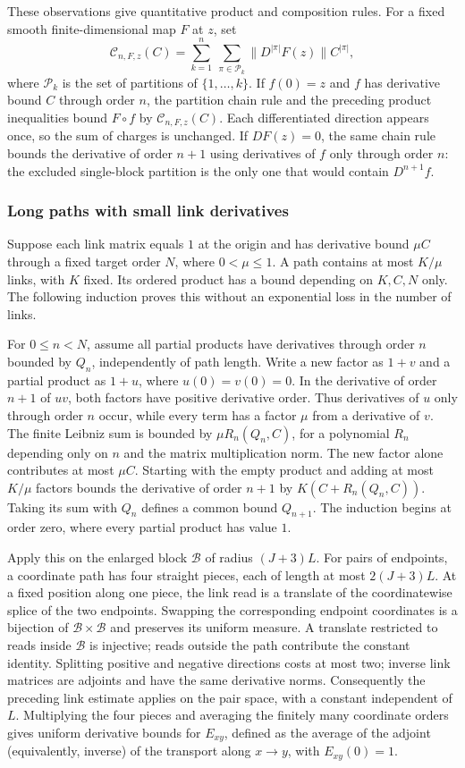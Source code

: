 These observations give quantitative product and composition rules.
For a fixed smooth finite-dimensional map $F$ at $z$, set
\[
 \mathcal C_{n,F,z}(C)
   =\sum_{k=1}^n\ \sum_{\pi\in\mathcal P_k}
                   \|D^{|\pi|}F(z)\|C^{|\pi|},
\]
where $\mathcal P_k$ is the set of partitions of $\{1,\ldots,k\}$.
If $f(0)=z$ and $f$ has derivative bound $C$ through order $n$, the
partition chain rule and the preceding product inequalities bound
$F\circ f$ by $\mathcal C_{n,F,z}(C)$. Each differentiated direction
appears once, so the sum of charges is unchanged. If $DF(z)=0$, the
same chain rule bounds the derivative of order $n+1$ using derivatives
of $f$ only through order $n$: the excluded single-block partition is
the only one that would contain $D^{n+1}f$.

\subsubsection{Long paths with small link derivatives}
Suppose each link matrix equals $1$ at the origin and has derivative
bound $\mu C$ through a fixed target order $N$, where $0<\mu\leq1$. A path contains
at most $K/\mu$ links, with $K$ fixed. Its ordered product has a bound
depending on $K,C,N$ only. The following induction proves this without
an exponential loss in the number of links.

For $0\leq n<N$, assume all partial products have derivatives through order $n$ bounded
by $Q_n$, independently of path length. Write a new factor as $1+v$
and a partial product as $1+u$, where $u(0)=v(0)=0$. In the derivative
of order $n+1$ of $uv$, both factors have positive derivative order.
Thus derivatives of $u$ only through order $n$ occur, while every term
has a factor $\mu$ from a derivative of $v$. The finite Leibniz sum is
bounded by $\mu R_n(Q_n,C)$, for a polynomial $R_n$ depending only on
$n$ and the matrix multiplication norm. The new factor alone contributes
at most $\mu C$. Starting with the empty product and adding at most
$K/\mu$ factors bounds the derivative of order $n+1$ by
$K(C+R_n(Q_n,C))$. Taking its sum with $Q_n$ defines a common bound
$Q_{n+1}$. The induction begins at order zero, where every partial
product has value $1$.

Apply this on the enlarged block $\mathcal B$ of radius $(J+3)L$.
For pairs of endpoints, a coordinate path has four straight pieces,
each of length at most $2(J+3)L$. At a fixed position along one piece,
the link read is a translate of the coordinatewise splice of the two
endpoints. Swapping the corresponding endpoint coordinates is a
bijection of $\mathcal B\times\mathcal B$ and preserves its uniform
measure. A translate restricted to reads inside $\mathcal B$ is
injective; reads outside the path contribute the constant identity.
Splitting positive and negative directions costs at most two; inverse
link matrices are adjoints and have the same derivative norms.
Consequently the preceding link estimate applies on the pair space,
with a constant independent of $L$. Multiplying the four pieces and
averaging the finitely many coordinate orders gives uniform derivative
bounds for $E_{xy}$, defined as the average of the adjoint (equivalently, inverse)
of the transport along $x\to y$, with $E_{xy}(0)=1$.


